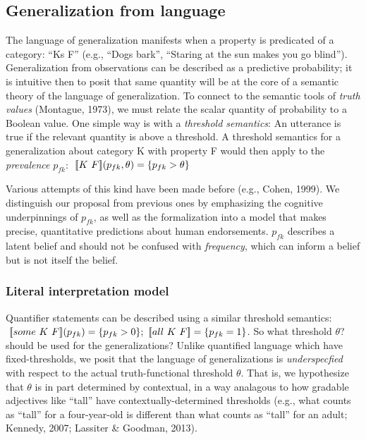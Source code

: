 \documentclass[english,floatsintext,man]{apa6}
\theoremstyle{definition}
\theoremstyle{definition}
\theoremstyle{definition}
\theoremstyle{remark}
\begin{document}
\subsection{Generalization from
language}\label{generalization-from-language}

The language of generalization manifests when a property is predicated
of a category: \enquote{Ks F} (e.g., \enquote{Dogs bark},
\enquote{Staring at the sun makes you go blind}). Generalization from
observations can be described as a predictive probability; it is
intuitive then to posit that same quantity will be at the core of a
semantic theory of the language of generalization. To connect to the
semantic tools of \emph{truth values} (Montague, 1973), we must relate
the scalar quantity of probability to a Boolean value. One simple way is
with a \emph{threshold semantics}: An utterance is true if the relevant
quantity is above a threshold. A threshold semantics for a
generalization about category K with property F would then apply to the
\emph{prevalence} \(p_{fk}\):
\(\mbox{ $[\![ K \text{ } F ]\!]$}(p_{fk}, \theta) = \{p_{fk} >\theta\}\)

Various attempts of this kind have been made before (e.g., Cohen, 1999).
We distinguish our proposal from previous ones by emphasizing the
cognitive underpinnings of \(p_{fk}\), as well as the formalization into
a model that makes precise, quantitative predictions about human
endorsements. \(p_{fk}\) describes a latent belief and should not be
confused with \emph{frequency}, which can inform a belief but is not
itself the belief.

\subsubsection{Literal interpretation
model}\label{literal-interpretation-model}

Quantifier statements can be described using a similar threshold
semantics:
\(\mbox{ $[\![ some \text{ } K \text{ } F ]\!]$}(p_{fk}) = \{p_{fk} > 0\}; \mbox{ $[\![ all \text{ } K \text{ } F ]\!]$} = \{p_{fk} = 1\}\).
So what threshold \(\theta\)? should be used for the generalizations?
Unlike quantified language which have fixed-thresholds, we posit that
the language of generalizations is \emph{underspecfied} with respect to
the actual truth-functional threshold \(\theta\). That is, we
hypothesize that \(\theta\) is in part determined by contextual, in a
way analagous to how gradable adjectives like \enquote{tall} have
contextually-determined thresholds (e.g., what counts as ``tall'' for a
four-year-old is different than what counts as ``tall'' for an adult;
Kennedy, 2007; Lassiter \& Goodman, 2013).
\end{document}
